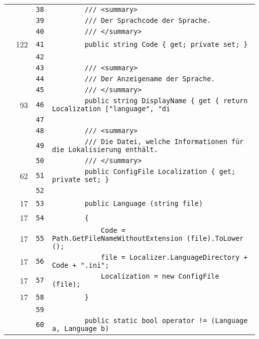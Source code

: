 \documentclass[a4paper,10pt]{article}
\begin{document}
\begin{longtable}[l]{lrrl}
\cellcolor{gray} &  & \verb~38~ & \verb~        /// <summary>~\\
\cellcolor{gray} &  & \verb~39~ & \verb~        /// Der Sprachcode der Sprache.~\\
\cellcolor{gray} &  & \verb~40~ & \verb~        /// </summary>~\\
\cellcolor{green} & 122 & \verb~41~ & \verb~        public string Code { get; private set; }~\\
\cellcolor{gray} &  & \verb~42~ & \verb~~\\
\cellcolor{gray} &  & \verb~43~ & \verb~        /// <summary>~\\
\cellcolor{gray} &  & \verb~44~ & \verb~        /// Der Anzeigename der Sprache.~\\
\cellcolor{gray} &  & \verb~45~ & \verb~        /// </summary>~\\
\cellcolor{green} & 93 & \verb~46~ & \verb~        public string DisplayName { get { return Localization ["language", "di~\\
\cellcolor{gray} &  & \verb~47~ & \verb~~\\
\cellcolor{gray} &  & \verb~48~ & \verb~        /// <summary>~\\
\cellcolor{gray} &  & \verb~49~ & \verb~        /// Die Datei, welche Informationen für die Lokalisierung enthält.~\\
\cellcolor{gray} &  & \verb~50~ & \verb~        /// </summary>~\\
\cellcolor{green} & 62 & \verb~51~ & \verb~        public ConfigFile Localization { get; private set; }~\\
\cellcolor{gray} &  & \verb~52~ & \verb~~\\
\cellcolor{green} & 17 & \verb~53~ & \verb~        public Language (string file)~\\
\cellcolor{green} & 17 & \verb~54~ & \verb~        {~\\
\cellcolor{green} & 17 & \verb~55~ & \verb~            Code = Path.GetFileNameWithoutExtension (file).ToLower ();~\\
\cellcolor{green} & 17 & \verb~56~ & \verb~            file = Localizer.LanguageDirectory + Code + ".ini";~\\
\cellcolor{green} & 17 & \verb~57~ & \verb~            Localization = new ConfigFile (file);~\\
\cellcolor{green} & 17 & \verb~58~ & \verb~        }~\\
\cellcolor{gray} &  & \verb~59~ & \verb~~\\
\cellcolor{gray} &  & \verb~60~ & \verb~        public static bool operator != (Language a, Language b)~\\

\end{longtable}
\end{document}

